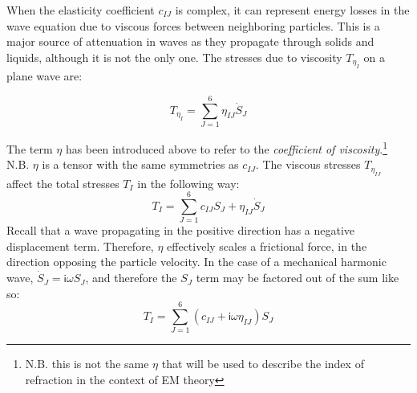 \documentclass[a4paper,10pt]{report}
\numberwithin{equation}{section}
\begin{document}
When the elasticity coefficient $c_{IJ}$ is complex, it can represent energy losses in the wave equation due to viscous forces between neighboring particles. This is a major source of attenuation in waves as they propagate through solids and liquids, although it is not the only one. The stresses due to viscosity $T_{\eta_I}$ on a plane wave are\cite[p.~8]{Kino1987}\cite[p.~21]{Ballantine1997}:

\begin{equation}\label{tviscous}
 T_{\eta_{I}} = \sum_{J=1}^6\eta_{IJ} \dot{S}_{J}
\end{equation}

The term $\eta$ has been introduced above to refer to the \emph{coefficient of viscosity}.\footnote{N.B. this is not the same $\eta$ that will be used to describe the index of refraction in the context of EM theory} N.B. $\eta$ is a tensor with the same symmetries as $c_{IJ}$. The viscous stresses $T_{\eta_{IJ}}$ affect the total stresses $T_I$ in the following way:
\begin{equation}\label{ttotal}
 T_I = \sum_{J=1}^6 c_{IJ}S_J + \eta_{IJ} \dot{S}_{J}
\end{equation}
Recall that a wave propagating in the positive direction has a negative displacement term. Therefore, $\eta$ effectively scales a frictional force, in the direction opposing the particle velocity. In the case of a mechanical harmonic wave, $\dot{S}_{J} = \mathsf{i}\omega S_{J}$, and therefore the $S_{J}$ term may be factored out of the sum like so:
\begin{equation}\label{tcomplex}
 T_I = \sum_{J=1}^6 (c_{IJ} + \mathsf{i}\omega\eta_{IJ})S_J
\end{equation}
\end{document}

